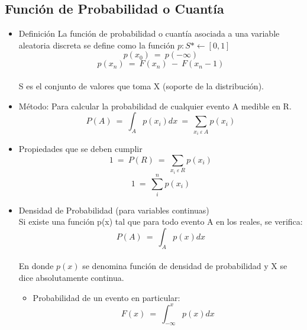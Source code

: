 	\subsection{Funci\'on de Probabilidad o Cuant\'ia}
		\begin{itemize}
			\item Definici\'on
                           La funci\'on de probabilidad o cuant\'ia asociada a una variable aleatoria discreta se define como la funci\'on $p: S* \leftarrow [0,1]$ 
				$$p(x_0)\ =\ p(-\infty)$$
				$$p(x_n)\ =\ F(x_n)\ -\ F(x_n-1)$$\\
				 S es el conjunto de valores que toma X (soporte de la distribuci\'on).

			\item M\'etodo: Para calcular la probabilidad de cualquier evento A medible en R.
				$$P(A)\ =\ \int_{A}p(x_i)dx\ =\ \sum_{x_i\ \varepsilon\ A}p(x_i)$$
			\item Propiedades que se deben cumplir
				$$1\ =\ P(R)\ =\ \sum_{x_i\ \varepsilon\ R}p(x_i)$$
				$$1\ =\ \sum_{i}^{n}p(x_i)$$
			\item Densidad de Probabilidad (para variables continuas)\\
				Si existe una funci\'on p(x) tal que para todo evento A en los reales, se verifica:
				$$P(A)\ =\ \int_{A}p(x)dx$$\\
				En donde $p(x)$ se denomina funci\'on de densidad de probabilidad y X se dice absolutamente continua.
				\begin{itemize}
					\item Probabilidad de un evento en particular:
						$$F(x)\ =\ \int_{-\infty}^{x}p(x)dx$$
				\end{itemize}

		\end{itemize}
